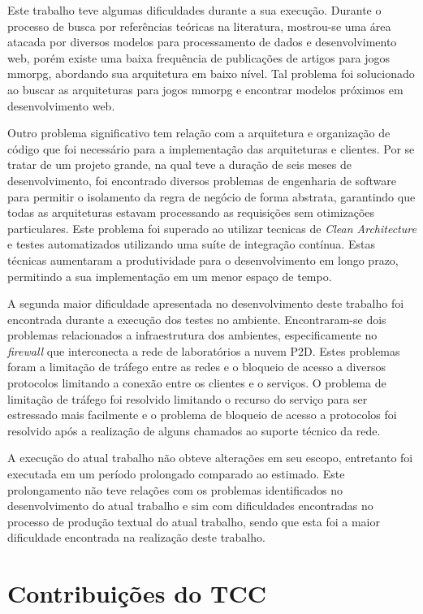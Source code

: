 Este trabalho teve algumas dificuldades durante a sua execução.
%
Durante o processo de busca por referências teóricas na literatura, mostrou-se uma área atacada por diversos modelos para processamento de dados e desenvolvimento web, porém existe uma baixa frequência de publicações de artigos para jogos \ac{mmorpg}, abordando sua arquitetura em baixo nível.
%
Tal problema foi solucionado ao buscar as arquiteturas para jogos \ac{mmorpg} e encontrar modelos próximos em desenvolvimento web.

Outro problema significativo tem relação com a arquitetura e organização de código que foi necessário para a implementação das arquiteturas e clientes.
%
Por se tratar de um projeto grande, na qual teve a duração de seis meses de desenvolvimento, foi encontrado diversos problemas de engenharia de software para permitir o isolamento da regra de negócio de forma abstrata, garantindo que todas as arquiteturas estavam processando as requisições sem otimizações particulares.
%
Este problema foi superado ao utilizar tecnicas de \textit{Clean Architecture} e testes automatizados utilizando uma suíte de integração contínua.
%
Estas técnicas aumentaram a produtividade para o desenvolvimento em longo prazo, permitindo a sua implementação em um menor espaço de tempo.
%

A segunda maior dificuldade apresentada no desenvolvimento deste trabalho foi encontrada durante a execução dos testes no ambiente.
%
Encontraram-se dois problemas relacionados a infraestrutura dos ambientes, especificamente no \textit{firewall} que interconecta a rede de laboratórios a nuvem P2D.
%
Estes problemas foram a limitação de tráfego entre as redes e o bloqueio de acesso a diversos protocolos limitando a conexão entre os clientes e o serviços.
%
O problema de limitação de tráfego foi resolvido limitando o recurso do serviço para ser estressado mais facilmente e o problema de bloqueio de acesso a protocolos foi resolvido após a realização de alguns chamados ao suporte técnico da rede.
%

A execução do atual trabalho não obteve alterações em seu escopo, entretanto foi executada em um período prolongado comparado ao estimado.
%
Este prolongamento não teve relações com os problemas identificados no desenvolvimento do atual trabalho e sim com dificuldades encontradas no processo de produção textual do atual trabalho, sendo que esta foi a maior dificuldade encontrada na realização deste trabalho.

\section{Contribuições do TCC}


